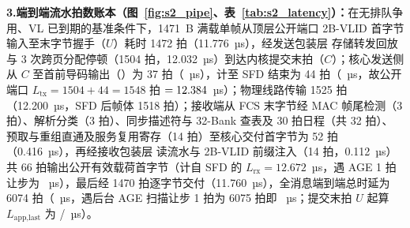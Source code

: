 \noindent \textbf{3.\quad 端到端流水拍数账本（图~\ref{fig:s2_pipe}、表~\ref{tab:s2_latency}）：}在无排队争用、VL 已到期的基准条件下，1471~B 满载单帧从顶层公开端口 2B-VLID 首字节输入至末字节握手（$U$）耗时 1472 拍（11.776~µs），经发送包装层  存储转发回放与 3 次跨页分配停顿（1504 拍，12.032~µs）到达内核提交末拍（$C$）；核心发送侧从 $C$ 至首前导码输出（）为 37 拍（\TtxSof~µs），计至 SFD 结束为 44 拍（\TtxCore~µs，故公开端口 $L_\text{tx}=1504+44=1548$ 拍 $=12.384$~µs）；物理线路传输 1525 拍（12.200~µs，SFD 后帧体 1518 拍）；接收端从 FCS 末字节经 MAC 帧尾检测（3 拍）、解析分类（3 拍）、同步描述符与 32-Bank 查表及  30 拍日程（共 32 拍）、 预取与重组直通及服务复用寄存（14 拍）至核心交付首字节为 52 拍（0.416~µs），再经接收包装层  读流水与 2B-VLID 前缀注入（14 拍，0.112~µs）共 66 拍输出公开有效载荷首字节（计自 SFD 的 $L_\text{rx}=12.672$~µs，遇 AGE 1 拍让步为 \Trx~µs），最后经 1470 拍逐字节交付（11.760~µs），全消息端到端总时延为 6074 拍（\LatAvg~µs，遇后台 AGE 扫描让步 1 拍为 6075 拍即 \Lat~µs；提交末拍 $U$ 起算 $L_\text{app,last}$ 为 \LatAppLastAvg/\LatAppLast~µs）。


